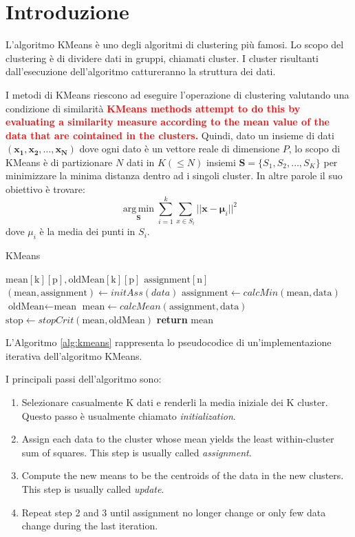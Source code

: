\documentclass[10pt,twocolumn,letterpaper]{article}
\newcommand\myworries[1]{\textbf{\textcolor{red}{#1}}}
\begin{document}
\section{Introduzione}
L'algoritmo KMeans è uno degli algoritmi di clustering più famosi. Lo scopo del clustering è di dividere dati in gruppi, chiamati cluster.
I cluster risultanti dall'esecuzione dell'algoritmo cattureranno la struttura dei dati.\par
I metodi di KMeans riescono ad eseguire l'operazione di clustering valutando una condizione di similarità
\myworries{KMeans methods attempt to do this by evaluating a similarity measure according to the mean value of
the data that are cointained in the clusters.}
Quindi, dato un insieme di dati $(\boldsymbol{x_{1}}, \boldsymbol{x_{2}}, \dots,\boldsymbol{x_{N}} )$ dove ogni dato è un vettore reale di dimensione $P$, lo scopo di KMeans è di partizionare $N$ dati in $K (\leq N)$ insiemi $\boldsymbol{S} = \{S_{1}, S_{2}, \dots, S_{K}\}$ per minimizzare la minima distanza dentro ad i singoli cluster. In altre parole il suo obiettivo è trovare: 
\begin{equation}
\label{eq:first}
\operatorname*{arg\, min}_{\boldsymbol{S}} \displaystyle\sum_{i = 1}^{k} \displaystyle\sum_{x \in S_{i}} ||\boldsymbol{x} - \boldsymbol{\mu}_{i} ||^{2}
\end{equation}  
dove $\mu_i$ è la media dei punti in $S_{i}$.\cite{wiki:kmeans}
\par
\begin{algorithm}
\caption{KMeans}
\label{alg:kmeans}
\begin{algorithmic}[1]
\State $\text{mean}[\text{k}][\text{p}], \text{oldMean}[\text{k}][\text{p}]$
\State $\text{assignment}[\text{n}]$
\State $(\text{mean}, \text{assignment}) \leftarrow initAss(data)$
\State $\text{assignment} \leftarrow calcMin(\text{mean}, \text{data})$
\State $\text{oldMean} \leftarrow \text{mean}$
\State $\text{mean} \leftarrow calcMean(\text{assignment}, \text{data})$
\State $\text{stop} \leftarrow stopCrit(\text{mean}, \text{oldMean})$
\EndWhile
\State \textbf{return} $\text{mean}$
\EndProcedure
\end{algorithmic}
\end{algorithm}
L'Algoritmo \ref{alg:kmeans} rappresenta lo pseudocodice di un'implementazione iterativa dell'algoritmo KMeans.

I principali passi dell'algoritmo sono:
\begin{enumerate}
	\item{Selezionare casualmente K dati e renderli la media iniziale dei K cluster. Questo passo è usualmente chiamato \textit{initialization}.}
	\item{Assign each data to the cluster whose mean yields the least within-cluster sum of squares. This step is usually called \textit{assignment}.}
	\item{Compute the new means to be the centroids of the data in the new clusters. This step is usually called \textit{update}.}
	\item{Repeat step 2 and 3 until assignment no longer change or only few data change during the last iteration. }
\end{enumerate}
\end{document}
